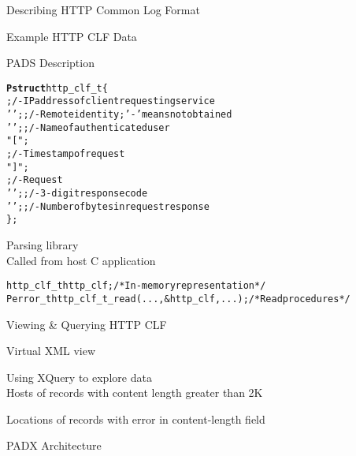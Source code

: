 \documentclass[landscape]{slides}
\newcommand{\bftt}[1]{{\ttfamily\bfseries{}#1}}
\newcommand{\kw}[1]{{\bftt{#1}}}
\begin{document}
\begin{Slide}{Describing HTTP Common Log Format}

  \bb Example HTTP CLF Data

{\small
\begin{alltt}
\end{alltt}
}
  \bb PADS Description

{\small
\begin{alltt}
\kw{Pstruct} http_clf_t \{
         ;              /- IP address of client requesting service
   ' ';  ;          /- Remote identity; '-' means not obtained
   ' ';  ;              /- Name of authenticated user
   " [";
   \darkgreen{Pdate(:']':)} ;             /- Timestamp of request
   "] ";
    ;           /- Request
   ' ';   ;   /- 3-digit response code
   ' ';   ; /- Number of bytes in request response
\};
\end{alltt}}

\bb Parsing library \\
\bbb Called from host C application

{\small
\begin{alltt}
  http_clf_t http_clf;        /* In-memory representation */
  Perror_t http_clf_t_read(..., &http_clf, ...); /* Read procedures */
\end{alltt}}


\end{Slide}

\begin{Slide}{Viewing \& Querying HTTP CLF}

  \bb Virtual XML view 
{\small
\begin{alltt}
\end{alltt}
}

\bb Using XQuery to explore data\\
\bbb Hosts of records with content length greater than 2K

{\small
\begin{alltt}
\end{alltt}}

\bbb Locations of records with error in content-length field

{\small
\begin{alltt}
\end{alltt}}
\end{Slide}

\begin{Slide}{PADX Architecture} 

\vspace{2cm}
\centerline{{}}

\end{Slide}

\end{document}
